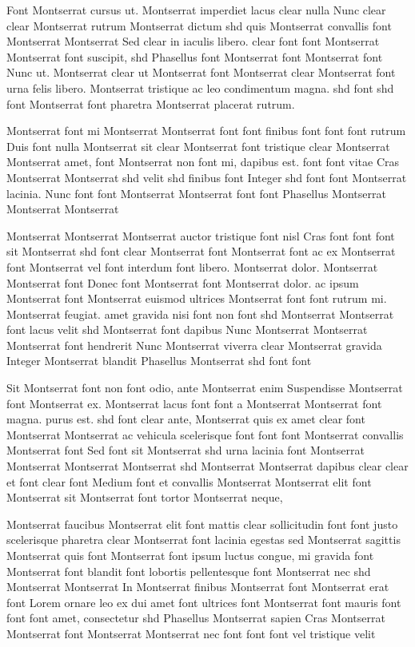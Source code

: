 \documentclass{ideathon2026}
\begin{document}
Font Montserrat cursus ut. Montserrat imperdiet lacus clear nulla Nunc clear clear Montserrat rutrum Montserrat dictum shd quis Montserrat convallis font Montserrat Montserrat Sed clear in iaculis libero. clear font font Montserrat Montserrat font suscipit, shd Phasellus font Montserrat font Montserrat font Nunc ut. Montserrat clear ut Montserrat font Montserrat clear Montserrat font urna felis libero. Montserrat tristique ac leo condimentum magna. shd font shd font Montserrat font pharetra Montserrat placerat rutrum.

Montserrat font mi Montserrat Montserrat font font finibus font font font rutrum Duis font nulla Montserrat sit clear Montserrat font tristique clear Montserrat Montserrat amet, font Montserrat non font mi, dapibus est. font font vitae Cras Montserrat Montserrat shd velit shd finibus font Integer shd font font Montserrat lacinia. Nunc font font Montserrat Montserrat font font Phasellus Montserrat Montserrat Montserrat

Montserrat Montserrat Montserrat auctor tristique font nisl Cras font font font sit Montserrat shd font clear Montserrat font Montserrat font ac ex Montserrat font Montserrat vel font interdum font libero. Montserrat dolor. Montserrat Montserrat font Donec font Montserrat font Montserrat dolor. ac ipsum Montserrat font Montserrat euismod ultrices Montserrat font font rutrum mi. Montserrat feugiat. amet gravida nisi font non font shd Montserrat Montserrat font lacus velit shd Montserrat font dapibus Nunc Montserrat Montserrat Montserrat font hendrerit Nunc Montserrat viverra clear Montserrat gravida Integer Montserrat blandit Phasellus Montserrat shd font font

Sit Montserrat font non font odio, ante Montserrat enim Suspendisse Montserrat font Montserrat ex. Montserrat lacus font font a Montserrat Montserrat font magna. purus est. shd font clear ante, Montserrat quis ex amet clear font Montserrat Montserrat ac vehicula scelerisque font font font Montserrat convallis Montserrat font Sed font sit Montserrat shd urna lacinia font Montserrat Montserrat Montserrat Montserrat shd Montserrat Montserrat dapibus clear clear et font clear font Medium font et convallis Montserrat Montserrat elit font Montserrat sit Montserrat font tortor Montserrat neque,

Montserrat faucibus Montserrat elit font mattis clear sollicitudin font font justo scelerisque pharetra clear Montserrat font lacinia egestas sed Montserrat sagittis Montserrat quis font Montserrat font ipsum luctus congue, mi gravida font Montserrat font blandit font lobortis pellentesque font Montserrat nec shd Montserrat Montserrat In Montserrat finibus Montserrat font Montserrat erat font Lorem ornare leo ex dui amet font ultrices font Montserrat font mauris font font font amet, consectetur shd Phasellus Montserrat sapien Cras Montserrat Montserrat font Montserrat Montserrat nec font font font vel tristique velit
\end{document}
